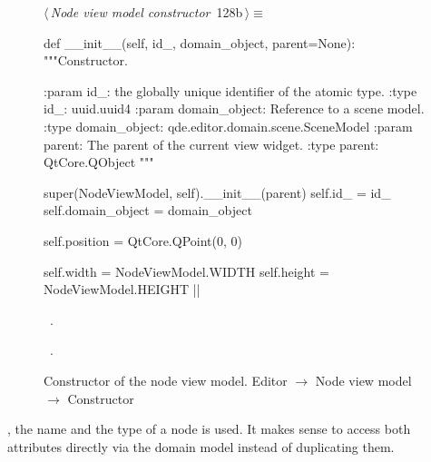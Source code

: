 \documentclass[%
    a4paper,    %
    justified,  %
    nobib,      %
    openany     %
]{tufte-book}
\makeatletter
\renewcommand{\label}[1]{\@tufte@label{##1}}%
\makeatother
\begin{document}
\begin{figure}[!htbp]
\begin{flushleft} \small
\begin{minipage}{\linewidth}\label{scrap68}\raggedright\small
{} $\langle\,${\itshape Node view model constructor}\nobreak\ {\footnotesize {128b}}$\,\rangle\equiv$
\vspace{-1ex}
\begin{pythoncode}
def __init__(self, id_, domain_object, parent=None):
    """Constructor.

    :param id_: the globally unique identifier of the atomic type.
    :type  id_: uuid.uuid4
    :param domain_object: Reference to a scene model.
    :type  domain_object: qde.editor.domain.scene.SceneModel
    :param parent: The parent of the current view widget.
    :type parent:  QtCore.QObject
    """

    super(NodeViewModel, self).__init__(parent)
    self.id_ = id_
    self.domain_object = domain_object

    self.position = QtCore.QPoint(0, 0)

    self.width  = NodeViewModel.WIDTH
    self.height = NodeViewModel.HEIGHT
|\NWsep|
\end{pythoncode}
\vspace{1.5ex}
\footnotesize
\begin{list}{}{\setlength{\itemsep}{-\parsep}\setlength{\itemindent}{-\leftmargin}}
\item \NWtxtMacroDefBy\ .
\item \NWtxtMacroRefIn\ .

\item{}
\end{list}
\end{minipage}\vspace{4ex}
\end{flushleft}
\caption{Constructor of the node view model.
  \newline{}\newline{}Editor $\rightarrow$ Node view model $\rightarrow$
  Constructor}
\end{figure}

, the name and the type of a node is used. It
makes sense to access both attributes directly via the domain model instead of
duplicating them.
\end{document}
